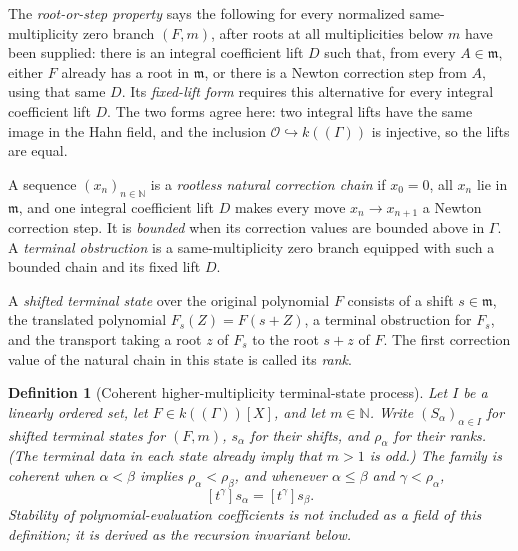\documentclass[11pt]{article}
\newcommand{\Ocal}{\mathcal O}
\theoremstyle{proofnote}
\newtheorem{definition}[theorem]{Definition}
\begin{document}
The \emph{root-or-step property} says the following for every normalized
same-multiplicity zero branch \((F,m)\), after roots at all multiplicities
below \(m\) have been supplied: there is an integral coefficient lift \(D\)
such that, from every \(A\in\mathfrak m\), either \(F\) already has a root in
\(\mathfrak m\), or there is a Newton correction step from \(A\), using that
same \(D\).  Its \emph{fixed-lift form} requires this alternative for every
integral coefficient lift \(D\).  The two forms agree here: two integral
lifts have the same image in the Hahn field, and the inclusion
\(\Ocal\hookrightarrow k((\Gamma))\) is injective, so the lifts are equal.

A sequence \((x_n)_{n\in\mathbb N}\) is a \emph{rootless natural correction
chain} if \(x_0=0\), all \(x_n\) lie in \(\mathfrak m\), and one integral
coefficient lift \(D\) makes every move \(x_n\to x_{n+1}\) a Newton
correction step.  It is \emph{bounded} when its correction values are bounded
above in \(\Gamma\).  A \emph{terminal obstruction} is a same-multiplicity
zero branch equipped with such a bounded chain and its fixed lift \(D\).

A \emph{shifted terminal state} over the original polynomial \(F\) consists
of a shift \(s\in\mathfrak m\), the translated polynomial
\(F_s(Z)=F(s+Z)\), a terminal obstruction for \(F_s\), and the transport
taking a root \(z\) of \(F_s\) to the root \(s+z\) of \(F\).  The first correction value of the
natural chain in this state is called its \emph{rank}.

\begin{definition}[Coherent higher-multiplicity terminal-state process]
\label{def:coherent-terminal-process}
  Let \(I\) be a linearly ordered set, let \(F\in k((\Gamma))[X]\), and let
  \(m\in\mathbb N\).  Write \((S_\alpha)_{\alpha\in I}\) for shifted
  terminal states for \((F,m)\), \(s_\alpha\) for their shifts, and
  \(\rho_\alpha\) for their ranks.  (The terminal data in each state already
  imply that \(m>1\) is odd.)  The family is
  \emph{coherent} when \(\alpha<\beta\) implies
  \(\rho_\alpha<\rho_\beta\), and whenever \(\alpha\le\beta\) and
  \(\gamma<\rho_\alpha\),
  \[
    [t^\gamma]s_\alpha=[t^\gamma]s_\beta.
    \tag{TC}\label{eq:terminal-coherence}
  \]
  Stability of polynomial-evaluation coefficients is not included as a
  field of this definition; it is derived as the recursion invariant below.
\end{definition}
\end{document}
